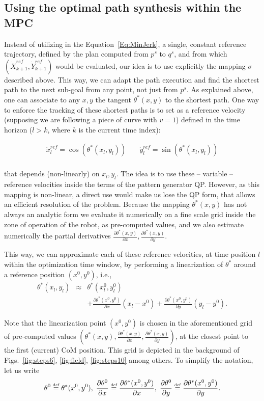 \subsection{Using the optimal path synthesis within the MPC}

Instead of utilizing in the Equation~\ref{Eq:MinJerk}, a single, constant reference trajectory, defined by the plan computed from $p^s$ to $q^s$, and from which $(\dot{X}_{k+1}^{ref},\dot{Y}_{k+1}^{ref})$ would be evaluated, our idea is to use explicitly the mapping $\sigma$ described above. This way, we can adapt the path execution and find the shortest path to the next sub-goal from any point, not just from $p^s$. As explained above, one can  associate to any $x,y$ the tangent $\theta^*(x,y)$ to the shortest path. One way to enforce the tracking of these shortest paths is to set as a reference velocity (supposing we are following a piece of curve with $v=1$) defined in the time horizon ($l>k$, where $k$ is the current time index):

$$
\begin{array}{ccc}
\dot{x}^{ref}_l =  \cos(\theta^*(x_l,y_l)) & \; & \dot{y}^{ref}_l =  \sin(\theta^*(x_l,y_l)) \\
\end{array}
$$

that depends (non-linearly) on $x_l,y_l$. The idea is to use these -- variable -- reference velocities inside the terms of the pattern generator QP. However, as this mapping is non-linear, a direct use would make us lose the QP form, that allows an efficient resolution of the problem. Because the mapping $\theta^*(x,y)$ has not always an analytic form we evaluate it numerically on a fine scale grid inside the zone of operation of the robot, as pre-computed values, and we also estimate numerically the partial derivatives $\frac{\partial \theta^*(x,y)}{\partial x},  \frac{\partial \theta^*(x,y)}{\partial y}$.

This way, we can approximate each of these reference velocities, at time position $l$ within the optimization time window, by performing a linearization of $\theta^*$  around a reference position $(x^0,y^0)$, i.e.,
$$
\begin{array}{ccc}
\theta^*(x_l,y_l) & \approx & \theta^*(x^0_l,y^0_l)  \\
& & + \frac{\partial \theta^*(x^0,y^0)}{\partial x} (x_l-x^0) + \frac{\partial \theta^*(x^0,y^0)}{\partial y} (y_l-y^0).
\end{array}
$$

Note that the linearization point $(x^0,y^0)$ is chosen in the aforementioned grid of pre-computed values $(\theta^*(x,y),\frac{\partial \theta^*(x,y)}{\partial x},  \frac{\partial \theta^*(x,y)}{\partial y})$, at the closest point to the first (current) CoM position. This grid is depicted in the background of Figs.~\ref{fig:steps6}, \ref{fig:field}, \ref{fig:steps10} among others. To simplify the notation, let us write
$$
\theta^0 \stackrel{\mbox{\tiny def}}{=}  \theta^*(x^0,y^0),\;
\frac{\partial \theta^0}{\partial x} \stackrel{\mbox{\tiny def}}{=} \frac{\partial \theta^*(x^0,y^0)}{\partial x},\;
\frac{\partial \theta^0}{\partial y} \stackrel{\mbox{\tiny def}}{=}  \frac{\partial \theta^*(x^0,y^0)}{\partial y}. 
$$


